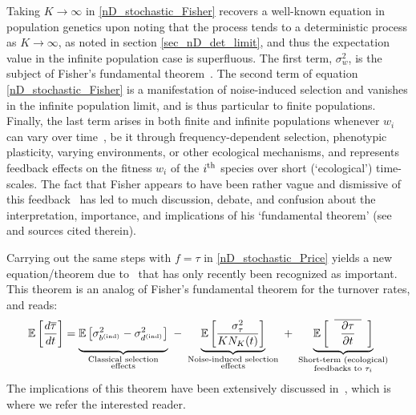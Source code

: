 Taking $K \to \infty$ in \eqref{nD_stochastic_Fisher} recovers a well-known equation in population genetics upon noting that the process tends to a deterministic process as $K \to \infty$, as noted in section \ref{sec_nD_det_limit}, and thus the expectation value in the infinite population case is superfluous. The first term, $\sigma^2_w$, is the subject of Fisher's fundamental theorem~\citep{fisher_genetical_1930,  price_fishers_1972, frank_fishers_1992, kokko_stagnation_2021}. The second term of equation \eqref{nD_stochastic_Fisher} is a manifestation of noise-induced selection and vanishes in the infinite population limit, and is thus particular to finite populations. Finally, the last term arises in both finite and infinite populations whenever $w_i$ can vary over time~\citep{frank_fishers_1992,kokko_stagnation_2021,baez_fundamental_2021}, be it through frequency-dependent selection, phenotypic plasticity, varying environments, or other ecological mechanisms, and represents feedback effects on the fitness $w_i$ of the $i\textsuperscript{th}$ species over short (`ecological') time-scales. The fact that Fisher appears to have been rather vague and dismissive of this feedback~\citep{fisher_genetical_1930} has led to much discussion, debate, and confusion about the interpretation, importance, and implications of his `fundamental theorem' (see~\cite{kokko_stagnation_2021} and sources cited therein).

Carrying out the same steps with $f = \tau$ in \eqref{nD_stochastic_Price} yields a new equation/theorem due to~\cite{kuosmanen_turnover_2022} that has only recently been recognized as important. This theorem is an analog of Fisher's fundamental theorem for the turnover rates, and reads:
\begin{equation}
\label{nD_stochastic_Fisher_turnover}
\mathbb{E}\left[\frac{d\overline{\tau}}{dt}\right] = \underbrace{\vphantom{ \mathbb{E}\left[\frac{\sigma^2_{\tau}}{KN_K(t)}\right] } \mathbb{E}\left[\sigma^2_{b^{\textrm{(ind)}}} - \sigma^2_{d^{\textrm{(ind)}}}\right]}_{\substack{\text{Classical selection} \\ \text{effects}}} \ - \ \underbrace{ \mathbb{E}\left[\frac{\sigma^2_{\tau}}{KN_K(t)}\right]}_{\substack{\text{Noise-induced selection} \\ \text{effects}}} \ + \ \underbrace{ \vphantom{ \mathbb{E}\left[\frac{\sigma^2_{\tau}}{KN_K(t)}\right] } \mathbb{E}\left[\hphantom{a}\overline{\hphantom{a}\frac{\partial \tau}{\partial t}\hphantom{a}}\hphantom{a}\right]}_{\substack{\text{Short-term (ecological)} \\ \text{feedbacks to $\tau_i$}}}
\end{equation}
The implications of this theorem have been extensively discussed in~\citep{kuosmanen_turnover_2022}, which is where we refer the interested reader.

